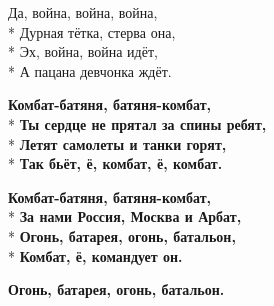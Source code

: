 \medskip

\begin{minipage}{\linewidth}
Да, война, война, война,\\*
Дурная тётка, стерва она,\\*
Эх, война, война идёт,\\*
А пацана девчонка ждёт.\\
\end{minipage}\par\medskip\nobreak

\medskip

\begin{minipage}{\linewidth}
\hspace*{1.5em}\textbf{Комбат-батяня, батяня-комбат,}\\*
\hspace*{1.5em}\textbf{Ты сердце не прятал за спины ребят,}\\*
\hspace*{1.5em}\textbf{Летят самолеты и танки горят,}\\*
\hspace*{1.5em}\textbf{Так бьёт, ё, комбат, ё, комбат.}\\
\end{minipage}\par\medskip\nobreak

\medskip

\begin{minipage}{\linewidth}
\hspace*{1.5em}\textbf{Комбат-батяня, батяня-комбат,}\\*
\hspace*{1.5em}\textbf{За нами Россия, Москва и Арбат,}\\*
\hspace*{1.5em}\textbf{Огонь, батарея, огонь, батальон,}\\*
\hspace*{1.5em}\textbf{Комбат, ё, командует он.}\\
\end{minipage}\par\medskip\nobreak

\medskip

\begin{minipage}{\linewidth}
\hspace*{1.5em}\textbf{Огонь, батарея, огонь, батальон.}\\
\end{minipage}

\vspace{\fill}\newpage

